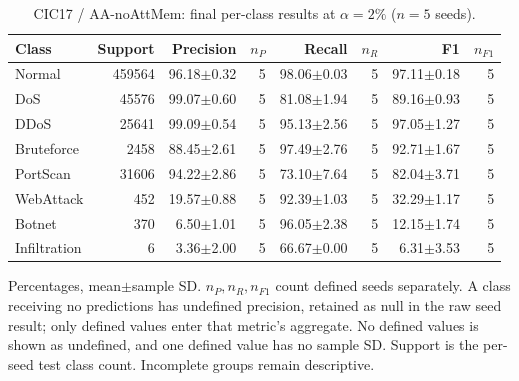 \begin{table}[t]
\centering\scriptsize
\setlength{\tabcolsep}{3.3pt}
\caption{CIC17 / AA-noAttMem: final per-class results at $\alpha=2\%$ ($n=5$ seeds).}\label{tab:forgetting-class-cic_ids_2017-aa-noattmem}
\begin{tabular}{lrrrrrrr}
\toprule
Class & Support & Precision & $n_P$ & Recall & $n_R$ & F1 & $n_{F1}$ \\
\midrule
Normal & 459564 & 96.18$\pm$0.32 & 5 & 98.06$\pm$0.03 & 5 & 97.11$\pm$0.18 & 5 \\
DoS & 45576 & 99.07$\pm$0.60 & 5 & 81.08$\pm$1.94 & 5 & 89.16$\pm$0.93 & 5 \\
DDoS & 25641 & 99.09$\pm$0.54 & 5 & 95.13$\pm$2.56 & 5 & 97.05$\pm$1.27 & 5 \\
Bruteforce & 2458 & 88.45$\pm$2.61 & 5 & 97.49$\pm$2.76 & 5 & 92.71$\pm$1.67 & 5 \\
PortScan & 31606 & 94.22$\pm$2.86 & 5 & 73.10$\pm$7.64 & 5 & 82.04$\pm$3.71 & 5 \\
WebAttack & 452 & 19.57$\pm$0.88 & 5 & 92.39$\pm$1.03 & 5 & 32.29$\pm$1.17 & 5 \\
Botnet & 370 & 6.50$\pm$1.01 & 5 & 96.05$\pm$2.38 & 5 & 12.15$\pm$1.74 & 5 \\
Infiltration & 6 & 3.36$\pm$2.00 & 5 & 66.67$\pm$0.00 & 5 & 6.31$\pm$3.53 & 5 \\
\bottomrule
\end{tabular}
\par\smallskip\begin{minipage}{0.98\textwidth}\scriptsize Percentages, mean$\pm$sample SD. $n_P,n_R,n_{F1}$ count defined seeds separately. A class receiving no predictions has undefined precision, retained as null in the raw seed result; only defined values enter that metric's aggregate. No defined values is shown as undefined, and one defined value has no sample SD. Support is the per-seed test class count. Incomplete groups remain descriptive.\end{minipage}
\end{table}

